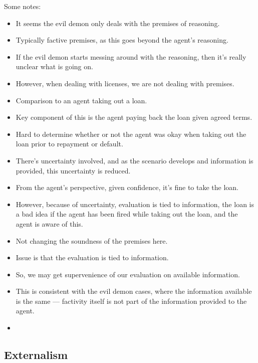 \documentclass[10pt]{article}
\begin{document}
\begin{note}
  Some notes:
  \begin{itemize}
  \item It seems the evil demon only deals with the premises of reasoning.
  \item Typically factive premises, as this goes beyond the agent's reasoning.
  \item If the evil demon starts messing around with the reasoning, then it's really unclear what is going on.
  \item However, when dealing with licenses, we are not dealing with premises.
  \end{itemize}

  \begin{itemize}
  \item Comparison to an agent taking out a loan.
  \item Key component of this is the agent paying back the loan given agreed terms.
  \item Hard to determine whether or not the agent was okay when taking out the loan prior to repayment or default.
  \item There's uncertainty involved, and as the scenario develops and information is provided, this uncertainty is reduced.
  \item From the agent's perspective, given confidence, it's fine to take the loan.
  \item However, because of uncertainty, evaluation is tied to information, the loan is a bad idea if the agent has been fired while taking out the loan, and the agent is aware of this.
  \item Not changing the soundness of the premises here.
  \item Issue is that the evaluation is tied to information.
  \item So, we may get supervenience of our evaluation on available information.
  \item This is consistent with the evil demon cases, where the information available is the same --- factivity itself is not part of the information provided to the agent.
  \item 
  \end{itemize}
\end{note}

\subsection{Externalism}
\label{sec:externalism}
\end{document}
